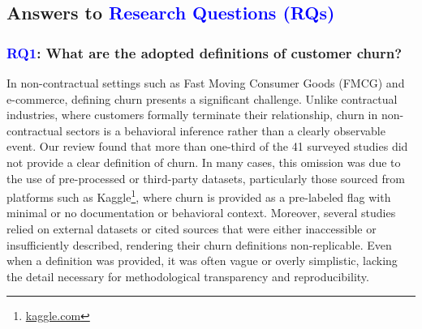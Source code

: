 \documentclass[preprint,12pt]{elsarticle}
\newcommand{\PSRQthree}{RQ3: How are primary studies distributed across authors’ affiliation countries?}
\newcommand{\RQlabel}[1]{\textcolor{blue}{#1}}
\newcommand{\RSRQone}{\RQlabel{RQ1}: What are the adopted definitions of customer churn?}
\begin{document}

\subsection{Answers to \textcolor{blue}{Research Questions (RQs)}}


\subsubsection{\RSRQone}
\label{sec:RQ1}

In non-contractual settings such as Fast Moving Consumer Goods (FMCG) and e-commerce, defining churn presents a significant challenge. Unlike contractual industries, where customers formally terminate their relationship, churn in non-contractual sectors is a behavioral inference rather than a clearly observable event. Our review found that more than one-third of the 41 surveyed studies did not provide a clear definition of churn. In many cases, this omission was due to the use of pre-processed or third-party datasets, particularly those sourced from platforms such as Kaggle\footnote{\url{kaggle.com}}, where churn is provided as a pre-labeled flag with minimal or no documentation or behavioral context. Moreover, several studies relied on external datasets or cited sources that were either inaccessible or insufficiently described, rendering their churn definitions non-replicable. Even when a definition was provided, it was often vague or overly simplistic, lacking the detail necessary for methodological transparency and reproducibility.
\end{document}
